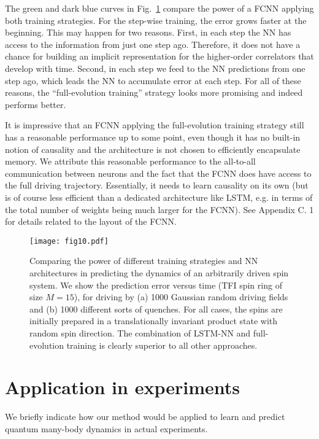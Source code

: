 \documentclass[a4paper,aps,amsmath,amssymb,twocolumn,longbibliography,,accepted=2022-05-17]{quantumarticle}
\begin{document}
The green and dark blue curves in Fig.~\ref{fig10} compare the power of a FCNN applying both training strategies. For the step-wise training, the error grows faster at the beginning. This may happen for two reasons. First, in each step the NN has access to the information from just one step ago. Therefore, it does not have a chance for building an implicit representation for the higher-order correlators that develop with time. Second, in each step we feed to the NN predictions from one step ago, which leads the NN to accumulate error at each step. For all of these reasons, the ``full-evolution training'' strategy looks more promising and indeed performs better.

It is impressive that an FCNN applying the full-evolution training strategy still has a reasonable performance up to some point, even though it has no built-in notion of causality and the architecture is not chosen to efficiently encapsulate memory. We attribute this reasonable performance to the all-to-all communication between neurons and the fact that the FCNN does have access to the full driving trajectory. Essentially, it needs to learn causality on its own (but is of course less efficient than a dedicated architecture like LSTM, e.g. in terms of the total number of weights being much larger for the FCNN). See Appendix C. 1 for details related to the layout of the FCNN.

\begin{figure}[h]
	\centering
	\texttt{[image: fig10.pdf]}
	\caption{
		Comparing the power of different training strategies and NN architectures in predicting the dynamics of an arbitrarily driven spin system. We show the prediction error versus time (TFI spin ring of size $M=15$), for driving by (a) 1000  Gaussian random driving fields and (b) 1000 different sorts of quenches. For all cases, the spins are initially prepared in a translationally invariant product state with random spin direction. The combination of LSTM-NN and full-evolution training is clearly superior to all other approaches.
	}
	\label{fig10}
\end{figure}

\section{Application in experiments}

We briefly indicate how our method would be applied to learn and predict quantum many-body dynamics in actual experiments. 
\end{document}
